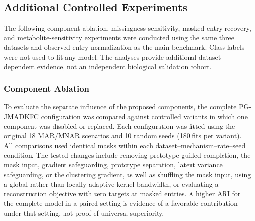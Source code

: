 \subsection{Additional Controlled Experiments}
The following component-ablation, missingness-sensitivity, masked-entry recovery, and metabolite-sensitivity experiments were conducted using the same three datasets and observed-entry normalization as the main benchmark. Class labels were not used to fit any model. The analyses provide additional dataset-dependent evidence, not an independent biological validation cohort.

\subsubsection{Component Ablation}
To evaluate the separate influence of the proposed components, the complete PG-JMADKFC configuration was compared against controlled variants in which one component was disabled or replaced. Each configuration was fitted using the original 18 MAR/MNAR scenarios and 10 random seeds (180 fits per variant). All comparisons used identical masks within each dataset--mechanism--rate--seed condition. The tested changes include removing prototype-guided completion, the mask input, gradient safeguarding, prototype separation, latent variance safeguarding, or the clustering gradient, as well as shuffling the mask input, using a global rather than locally adaptive kernel bandwidth, or evaluating a reconstruction objective with zero targets at masked entries. A higher ARI for the complete model in a paired setting is evidence of a favorable contribution under that setting, not proof of universal superiority.

